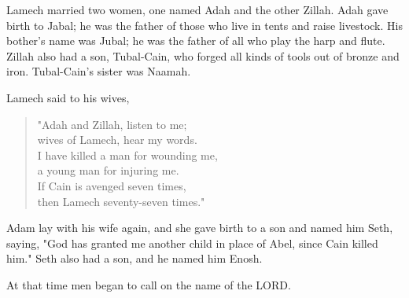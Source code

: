 \V Lamech married two women, one named Adah and the other Zillah. \V Adah gave
birth to Jabal; he was the father of those who live in tents and raise
livestock. \V His bother's name was Jubal; he was the father of all who play the
harp and flute. \V Zillah also had a son, Tubal-Cain, who forged all kinds of
tools out of bronze and iron. Tubal-Cain's sister was Naamah.

\V Lamech said to his wives,

\begin{quotation}
"Adah and Zillah, listen to me;\\
wives of Lamech, hear my words.\\
I have killed a man for wounding me,\\
a young man for injuring me.\\
\V If Cain is avenged seven times,\\
then Lamech seventy-seven times."
\end{quotation}

\V Adam lay with his wife again, and she gave birth to a son and named him Seth,
saying, "God has granted me another child in place of Abel, since Cain killed
him." \V Seth also had a son, and he named him Enosh.

At that time men began to call on the name of the LORD.
